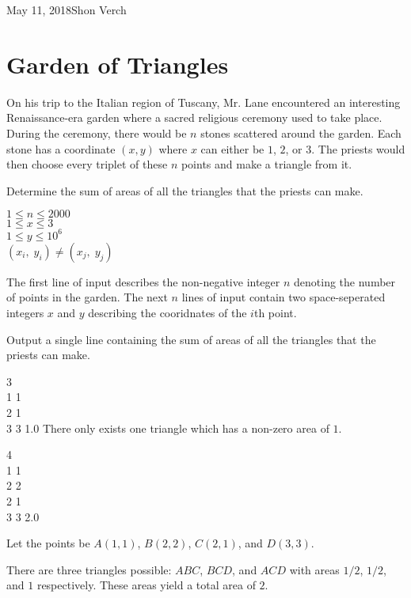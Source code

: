 

             {May 11, 2018}{Shon Verch}


\makeHeader

\section{Garden of Triangles}
On his trip to the Italian region of Tuscany, Mr. Lane encountered an interesting Renaissance-era garden where a sacred religious ceremony used to take place. During the ceremony, there would be $n$ stones scattered around the garden. Each stone has a coordinate $(x,y)$ where $x$ can either be $1$, $2$, or $3$. The priests would then choose every triplet of these $n$ points and make a triangle from it. 

Determine the sum of areas of all the triangles that the priests can make.\\

 
\constraints
$1 \leq n \leq 2000$\\
$1 \leq x \leq 3$\\
$1 \leq y \leq 10^6$\\
$(x_i,\;y_i) \neq (x_j,\;y_j)$

The first line of input describes the non-negative integer $n$ denoting the number of points in the garden. The next $n$ lines of input contain two space-seperated integers $x$ and $y$ describing the cooridnates of the $i$th point.

\outputformat
Output a single line containing the sum of areas of all the triangles that the priests can make.

\pushnewpage

\addsampleExplanation
{
3\\
1 1\\
2 1\\
3 3
}
{
1.0
}
{
There only exists one triangle which has a non-zero area of $1$.
}

\addsampleExplanation
{
4\\
1 1\\
2 2\\
2 1\\
3 3
}
{
2.0
}
{
Let the points be $A(1,1)$, $B(2,2)$, $C(2,1)$, and $D(3,3)$. 

There are three triangles possible: $ABC$, $BCD$, and $ACD$ with areas $1/2$, $1/2$, and $1$ respectively. These areas yield a total area of $2$.
}

